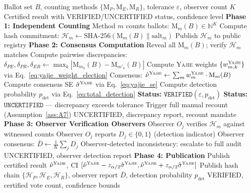 \documentclass[11pt,a4paper]{article}
\theoremstyle{definition}
\newcommand{\Yajie}{\textsc{Yajie}}
\newcommand{\N}{\mathbb{N}}
\newcommand{\method}[1]{\mathrm{M}_{#1}}
\newcommand{\auditConsensus}{\hat{\nu}^{\Yajie}}
\begin{document}
\begin{algorithm}[htbp]
\caption{\Yajie{} Multi-Method Vote Certification Protocol }
\label{alg:certification}
\begin{algorithmic}[1]
\Require Ballot set $B$, counting methods $\{\method{P}, \method{E}, \method{R}\}$, tolerance $\varepsilon$, observer count $K$
\Ensure Certified result with VERIFIED/UNCERTIFIED status, confidence level
\State \textbf{Phase 1: Independent Counting}
    \State Method $m$ counts ballots: $\method{m}(B) \in \N^K$
    \State Compute hash commitment: $\mathcal{H}_m \gets \text{SHA-256}(\method{m}(B) \| \text{salt}_m)$
    \State Publish $\mathcal{H}_m$ to public registry
\EndFor
\State \textbf{Phase 2: Consensus Computation}
\State Reveal all $\method{m}(B)$; verify $\mathcal{H}_m$ matches
\State Compute pairwise discrepancies: $\delta_{PE}, \delta_{PR}, \delta_{ER} \gets \max_k |\method{m}_k(B) - \method{m'}_k(B)|$
    \State Compute \Yajie{} weights $\{w_{m,k}^{\Yajie}\}$ via Eq.~\eqref{eq:yajie_weight_election}
    \State Consensus: $\auditConsensus \gets \sum_m w_m^{\Yajie} \cdot \method{m}(B)$
    \State Compute consensus SE $\hat{\sigma}^{\Yajie}$ via Eq.~\eqref{eq:yajie_se}
    \State Compute detection probability $p_{\text{det}}$ via Eq.~\eqref{eq:total_detection}
    \State \textbf{Status:} $\texttt{VERIFIED}(\varepsilon, p_{\text{det}})$
\Else
    \State \textbf{Status:} $\texttt{UNCERTIFIED}$ --- discrepancy exceeds tolerance
    \State Trigger full manual recount (Assumption~\ref{ass:A7})
    \State \Return UNCERTIFIED, discrepancy report, recount mandate
\EndIf
\State \textbf{Phase 3: Observer Verification Observers}
    \State Observer $O_j$ verifies $\mathcal{H}_m$ against witnessed counts
    \State Observer $O_j$ reports $D_j \in \{0, 1\}$ (detection indicator)
\EndFor
\State Observer consensus: $\bar{D} \gets \frac{1}{K} \sum_j D_j$
    \State Observer-detected inconsistency: escalate to full audit
    \State \Return UNCERTIFIED, observer detection report
\EndIf
\State \textbf{Phase 4: Publication}
\State Publish certified result $\auditConsensus$, CI $[\auditConsensus - z_{\alpha/2}\hat{\sigma}^{\Yajie}, \auditConsensus + z_{\alpha/2}\hat{\sigma}^{\Yajie}]$
\State Publish hash chain $\{\mathcal{H}_P, \mathcal{H}_E, \mathcal{H}_R\}$, observer report $\bar{D}$, detection probability $p_{\text{det}}$
\State \Return VERIFIED, certified vote count, confidence bounds
\end{algorithmic}
\end{algorithm}
\end{document}
